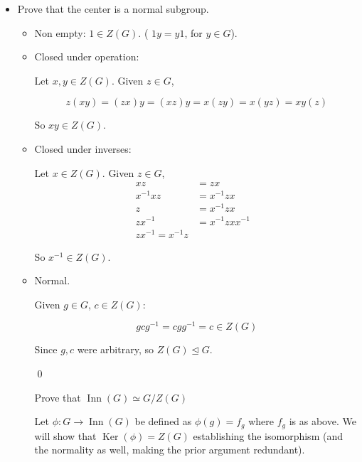 \documentclass[11pt,oneside]{article}
\numberwithin{equation}{section}
\theoremstyle{definition}
\def\Inn{\operatorname{Inn}}
\def\Ker{\operatorname{Ker}}
\begin{document}
\begin{solution}
\begin{enumerate}[(a)]
\begin{itemize}
        $$
        f_a \circ f_{a^{-1}} (x)  = f_a(a ^ {-1} x a) = a a^ {-1} x a a^{-1} = x = 1 x 1 = f_{1}(x)
        $$

        So $f_a ^ {-1} = f_{a^{-1}} \in \Inn(G)$.

        \qed

      \item
        Prove that the center is a normal subgroup.
        \begin{itemize}
        \item
          Non empty: $1 \in Z(G)$. ( $1y = y1$, for $y \in G$).
        \item
          Closed under operation:
          
          Let $x, y \in Z(G)$.  Given $z \in G$,

          $$
          z (xy) = (zx) y = (xz) y = x (zy) = x (yz) = xy(z)
          $$

          So $xy \in Z(G)$.
        \item
          Closed under inverses:

          Let $x \in Z(G)$.  Given $z \in G$,
          \begin{align*}
            xz & = zx & \\
            x^{-1} x z & = x^{-1} z x & \\
            z & = x^{-1} z x & \\
            z x ^ {-1} & = x^{-1} z x x ^ { -1} & \\
            z x ^ {-1} = x^ { -1} z
          \end{align*}

          So $x^{-1} \in Z(G)$.

        \item
          Normal.

          Given $ g \in G$, $c \in Z(G)$:

          $$
          g c g ^ {-1} = c g g^{-1} = c \in Z(G)
          $$

          Since $g,c $ were arbitrary, so $Z(G) \trianglelefteq G$.

          \qed

          Prove that $ \Inn(G) \simeq G / Z(G)$

          Let $\phi : G \to \Inn(G)$ be defined as $\phi (g) = f_g$ where
          $f_g$ is as above.  We will show that $\Ker(\phi) = Z(G)$ establishing
          the isomorphism (and the normality as well, making the prior argument redundant).


\end{itemize}
\end{itemize}
\end{enumerate}
\end{solution}
\end{document}
